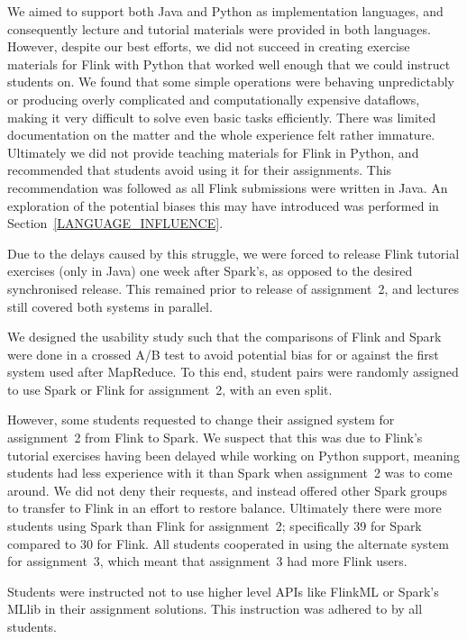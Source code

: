   We aimed to support both Java and Python as implementation languages, and consequently lecture and tutorial materials were provided in both languages. However, despite our best efforts, we did not succeed in creating exercise materials for Flink with Python that worked well enough that we could instruct students on. We found that some simple operations were behaving unpredictably or producing overly complicated and computationally expensive dataflows, making it very difficult to solve even basic tasks efficiently. There was limited documentation on the matter and the whole experience felt rather immature. Ultimately we did not provide teaching materials for Flink in Python, and recommended that students avoid using it for their assignments. This recommendation was followed as all Flink submissions were written in Java. An exploration of the potential biases this may have introduced was performed in Section~\ref{LANGUAGE_INFLUENCE}.
  
  Due to the delays caused by this struggle, we were forced to release Flink tutorial exercises (only in Java) one week after Spark's, as opposed to the desired synchronised release. This remained prior to release of assignment~2, and lectures still covered both systems in parallel.
  
  We designed the usability study such that the comparisons of Flink and Spark were done in a crossed A/B test to avoid potential bias for or against the first system used after MapReduce. To this end, student pairs were randomly assigned to use Spark or Flink for assignment~2, with an even split.
  
  However, some students requested to change their assigned system for assignment~2 from Flink to Spark. We suspect that this was due to Flink's tutorial exercises having been delayed while working on Python support, meaning students had less experience with it than Spark when assignment~2 was to come around. We did not deny their requests, and instead offered other Spark groups to transfer to Flink in an effort to restore balance. Ultimately there were more students using Spark than Flink for assignment~2; specifically 39 for Spark compared to 30 for Flink. All students cooperated in using the alternate system for assignment~3, which meant that assignment~3 had more Flink users.

  Students were instructed not to use higher level APIs like FlinkML or Spark's MLlib in their assignment solutions. This instruction was adhered to by all students.

